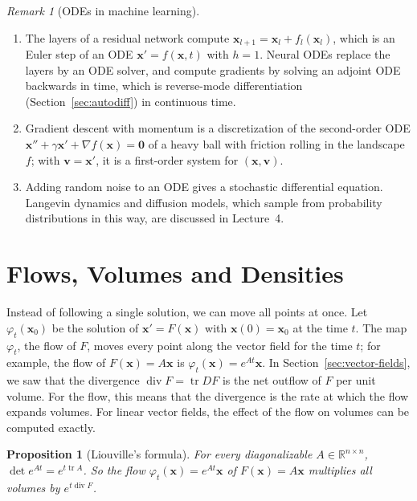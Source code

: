 \documentclass[11pt]{article}
\theoremstyle{definition}
\theoremstyle{plain}
\newtheorem{proposition}[definition]{Proposition}
\theoremstyle{remark}
\newtheorem{remark}[definition]{Remark}
\DeclareMathOperator{\tr}{tr}
\DeclareMathOperator{\Div}{div}
\begin{document}
\begin{remark}[ODEs in machine learning]
    \begin{enumerate}
        \item The layers of a residual network compute $\mathbf{x}_{l+1} = \mathbf{x}_l + f_l(\mathbf{x}_l)$, which is an Euler step of an ODE $\mathbf{x}' = f(\mathbf{x}, t)$ with $h = 1$. Neural ODEs replace the layers by an ODE solver, and compute gradients by solving an adjoint ODE backwards in time, which is reverse-mode differentiation (Section~\ref{sec:autodiff}) in continuous time.
        \item Gradient descent with momentum is a discretization of the second-order ODE $\mathbf{x}'' + \gamma\mathbf{x}' + \nabla f(\mathbf{x}) = \mathbf{0}$ of a heavy ball with friction rolling in the landscape $f$; with $\mathbf{v} = \mathbf{x}'$, it is a first-order system for $(\mathbf{x}, \mathbf{v})$.
        \item Adding random noise to an ODE gives a stochastic differential equation. Langevin dynamics and diffusion models, which sample from probability distributions in this way, are discussed in Lecture~4.
    \end{enumerate}
\end{remark}

\section{Flows, Volumes and Densities}\label{sec:flows}

Instead of following a single solution, we can move all points at once. Let $\varphi_t(\mathbf{x}_0)$ be the solution of $\mathbf{x}' = F(\mathbf{x})$ with $\mathbf{x}(0) = \mathbf{x}_0$ at the time $t$. The map $\varphi_t$, the flow of $F$, moves every point along the vector field for the time $t$; for example, the flow of $F(\mathbf{x}) = A\mathbf{x}$ is $\varphi_t(\mathbf{x}) = e^{At}\mathbf{x}$. In Section~\ref{sec:vector-fields}, we saw that the divergence $\Div F = \tr DF$ is the net outflow of $F$ per unit volume. For the flow, this means that the divergence is the rate at which the flow expands volumes. For linear vector fields, the effect of the flow on volumes can be computed exactly.

\begin{proposition}[Liouville's formula]\label{prop:liouville}
    For every diagonalizable $A \in \mathbb{R}^{n \times n}$, $\det e^{At} = e^{t\tr A}$. So the flow $\varphi_t(\mathbf{x}) = e^{At}\mathbf{x}$ of $F(\mathbf{x}) = A\mathbf{x}$ multiplies all volumes by $e^{t\Div F}$.
\end{proposition}
\end{document}
